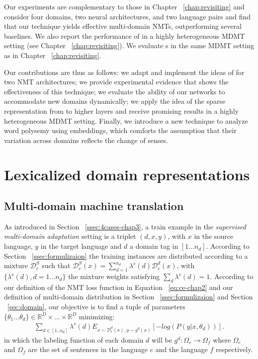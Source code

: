 Our experiments are complementary to those in Chapter ~\ref{chap:revisiting} and consider four domains, two neural architectures, and two language pairs and find that our technique yields effective multi-domain NMTs, outperforming several baselines. We also report the performance of  in a highly heterogeneous MDMT setting (see Chapter ~\ref{chap:revisiting}). We evaluate s in the same MDMT setting as in Chapter ~\ref{chap:revisiting}.

Our contributions are thus as follows: we adapt and implement the ideas of \citet{Daume07frustratingly} for two NMT architectures; we provide experimental evidence that shows the effectiveness of this technique; we evaluate the ability of our networks to accommodate new domains dynamically; we apply the idea of the sparse representation from  to higher layers and receive promising results in a highly heterogeneous MDMT setting. Finally, we introduce a new technique to analyze word polysemy using embeddings, which comforts the assumption that their variation across domains reflects the change of senses.

\section{Lexicalized domain representations\label{sec:lexicalized_embeddings-chap5}}
\subsection{Multi-domain machine translation \label{ssec:statement-chap5}}
As introduced in Section ~\ref{ssec:4cases-chap3}, a train example in the \emph{supervised multi-domain adaptation} setting is a triplet $(d,x,y)$, with $x$ in the source language, $y$ in the target language and $d$ a domain tag in $[1\dots n_d]$. According to Section ~\ref{ssec:formulizaion} the training instances are distributed according to a mixture $\mathcal{D}_e^S$ such that $\mathcal{D}_e^S(x) = \sum_{d=1}^{n_d} \lambda^{s}(d) \mathcal{D}_e^d(x)$, with $\{\lambda^{s}(d), d=1 \dots n_d\}$ the mixture weights satisfying $\sum_d \lambda^{s}(d)=1$. According to our definition of the NMT loss function in Equation ~\eqref{eq:ce-chap2} and our definition of multi-domain distribution in Section ~\ref{ssec:formulizaion} and Section ~\ref{sec:domain}, our objective is to find a tuple of parameters $\{\theta_1 \dots \theta_d \} \in \mathbb{R}^D \times \dots \times \mathbb{R}^D$ minimizing:
\begin{equation} \label{eq:loss-chap5}
\begin{split}
\sum_{d \in [1..n_d]} \lambda^{s}(d) E_{x \sim \mathcal{D}_e^d(x), y \sim g^d(x)} [-log(P(y|x,\theta_d))] \text{.}
\end{split}
\end{equation}
in which the labeling function of each domain $d$ will be $g^d: \Omega_{e} \rightarrow \Omega_{f}$ where $\Omega_{e}$ and $\Omega_{f}$ are the set of sentences in the language $e$ and the language $f$ respectively.

